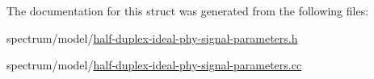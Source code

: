 The documentation for this struct was generated from the following files\+:\begin{DoxyCompactItemize}
\item 
spectrum/model/\hyperlink{half-duplex-ideal-phy-signal-parameters_8h}{half-\/duplex-\/ideal-\/phy-\/signal-\/parameters.\+h}\item 
spectrum/model/\hyperlink{half-duplex-ideal-phy-signal-parameters_8cc}{half-\/duplex-\/ideal-\/phy-\/signal-\/parameters.\+cc}\end{DoxyCompactItemize}
